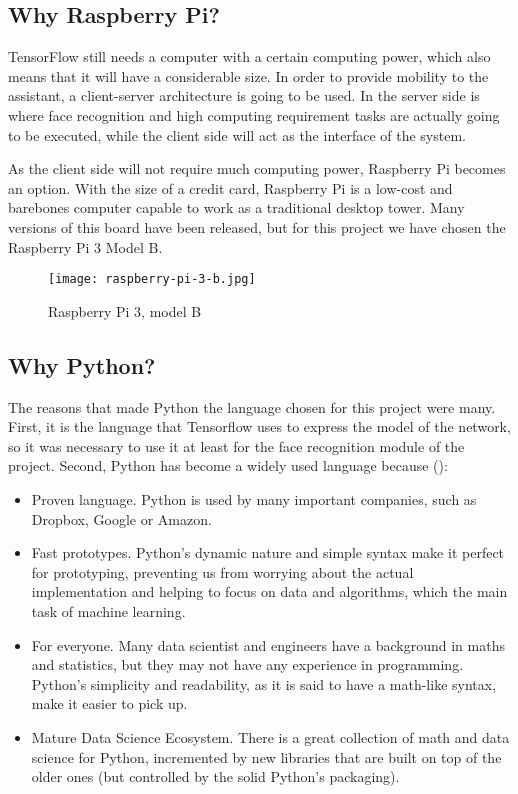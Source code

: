 	\subsection{Why Raspberry Pi?}
	TensorFlow still needs a computer with a certain computing power, which also means that it will have a considerable size. In order to provide mobility to the assistant, a client-server architecture is going to be used. In the server side is where face recognition and high computing requirement tasks are actually going to be executed, while the client side will act as the interface of the system. 

	As the client side will not require much computing power, Raspberry Pi becomes an option. With the size of a credit card, Raspberry Pi is a low-cost and barebones computer capable to work as a traditional desktop tower. Many versions of this board have been released, but for this project we have chosen the Raspberry Pi 3 Model B.

	\begin{figure}[ht]
		\centering
		\texttt{[image: raspberry-pi-3-b.jpg]}
		\caption{Raspberry Pi 3, model B}
	\end{figure}

	\subsection{Why Python?}
	The reasons that made Python the language chosen for this project were many. First, it is the language that Tensorflow uses to express the model of the network, so it was necessary to use it at least for the face recognition module of the project. Second, Python has become a widely used language because (\cite{why_python}):

	\begin{itemize}
		\item Proven language. Python is used by many important companies, such as Dropbox, Google or Amazon. 
		\item Fast prototypes. Python's dynamic nature and simple syntax make it perfect for prototyping, preventing us from worrying about the actual implementation and helping to focus on data and algorithms, which the main task of machine learning.
		\item For everyone. Many data scientist and engineers have a background in maths and statistics, but they may not have any experience in programming. Python's simplicity and readability, as it is said to have a math-like syntax, make it easier to pick up.
		\item Mature Data Science Ecosystem. There is a great collection of math and data science for Python, incremented by new libraries that are built on top of the older ones (but controlled by the solid Python's packaging). 
	\end{itemize}

